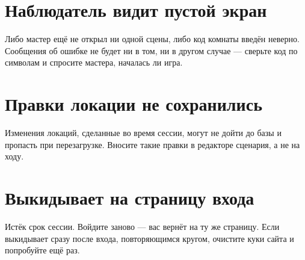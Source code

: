 \section{Наблюдатель видит пустой экран}
\label{sec:trouble:observer-empty}

Либо мастер ещё не открыл ни одной сцены, либо код комнаты введён неверно. Сообщения об ошибке не будет ни в том, ни в другом случае --- сверьте код по символам и спросите мастера, началась ли игра.

\section{Правки локации не сохранились}
\label{sec:trouble:lost-edits}

Изменения локаций, сделанные во время сессии, могут не дойти до базы и пропасть при перезагрузке. Вносите такие правки в редакторе сценария, а не на ходу.

\section{Выкидывает на страницу входа}
\label{sec:trouble:logout}

Истёк срок сессии. Войдите заново --- вас вернёт на ту же страницу. Если выкидывает сразу после входа, повторяющимся кругом, очистите куки сайта и попробуйте ещё раз.
